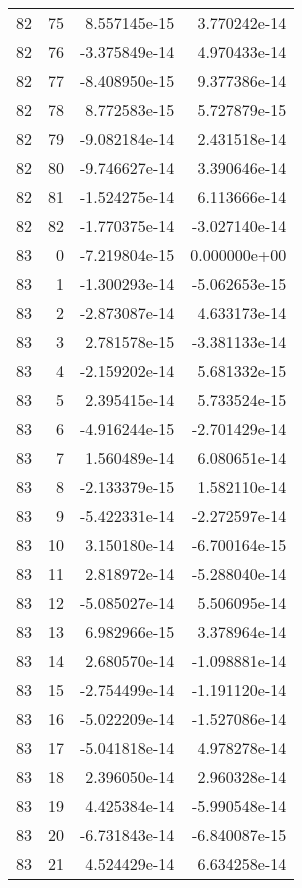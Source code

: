 \begin{tabular}{rrrr}
  82 &   75 &  8.557145e-15 &  3.770242e-14 \\
  82 &   76 & -3.375849e-14 &  4.970433e-14 \\
  82 &   77 & -8.408950e-15 &  9.377386e-14 \\
  82 &   78 &  8.772583e-15 &  5.727879e-15 \\
  82 &   79 & -9.082184e-14 &  2.431518e-14 \\
  82 &   80 & -9.746627e-14 &  3.390646e-14 \\
  82 &   81 & -1.524275e-14 &  6.113666e-14 \\
  82 &   82 & -1.770375e-14 & -3.027140e-14 \\
  83 &    0 & -7.219804e-15 &  0.000000e+00 \\
  83 &    1 & -1.300293e-14 & -5.062653e-15 \\
  83 &    2 & -2.873087e-14 &  4.633173e-14 \\
  83 &    3 &  2.781578e-15 & -3.381133e-14 \\
  83 &    4 & -2.159202e-14 &  5.681332e-15 \\
  83 &    5 &  2.395415e-14 &  5.733524e-15 \\
  83 &    6 & -4.916244e-15 & -2.701429e-14 \\
  83 &    7 &  1.560489e-14 &  6.080651e-14 \\
  83 &    8 & -2.133379e-15 &  1.582110e-14 \\
  83 &    9 & -5.422331e-14 & -2.272597e-14 \\
  83 &   10 &  3.150180e-14 & -6.700164e-15 \\
  83 &   11 &  2.818972e-14 & -5.288040e-14 \\
  83 &   12 & -5.085027e-14 &  5.506095e-14 \\
  83 &   13 &  6.982966e-15 &  3.378964e-14 \\
  83 &   14 &  2.680570e-14 & -1.098881e-14 \\
  83 &   15 & -2.754499e-14 & -1.191120e-14 \\
  83 &   16 & -5.022209e-14 & -1.527086e-14 \\
  83 &   17 & -5.041818e-14 &  4.978278e-14 \\
  83 &   18 &  2.396050e-14 &  2.960328e-14 \\
  83 &   19 &  4.425384e-14 & -5.990548e-14 \\
  83 &   20 & -6.731843e-14 & -6.840087e-15 \\
  83 &   21 &  4.524429e-14 &  6.634258e-14 \\

\end{tabular}
